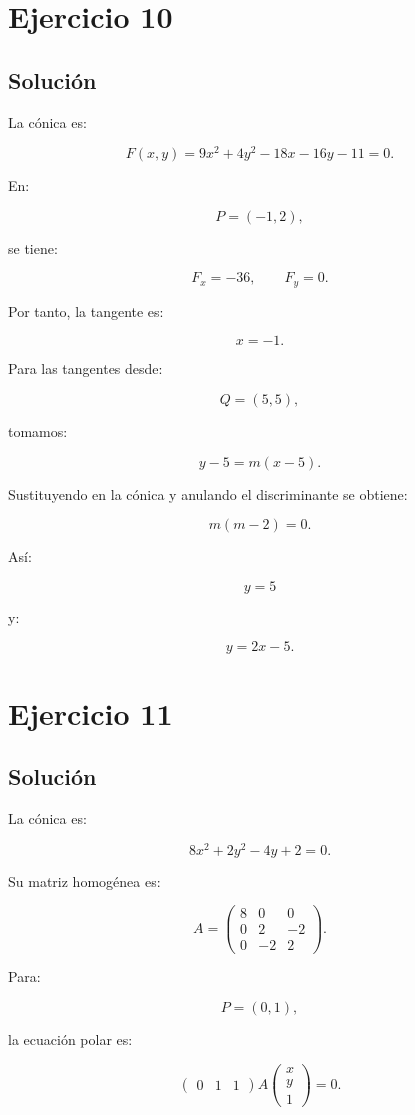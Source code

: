 \documentclass[11pt,a4paper]{article}
\begin{document}
\section{Ejercicio 10}
\subsection{Solución}

La cónica es:

\[
F(x,y)
=
9x^2+4y^2-18x-16y-11=0.
\]

En:

\[
P=(-1,2),
\]

se tiene:

\[
F_x=-36,
\qquad
F_y=0.
\]

Por tanto, la tangente es:

\[
\boxed{x=-1.}
\]

Para las tangentes desde:

\[
Q=(5,5),
\]

tomamos:

\[
y-5=m(x-5).
\]

Sustituyendo en la cónica y anulando el discriminante se obtiene:

\[
m(m-2)=0.
\]

Así:

\[
\boxed{
y=5
}
\]

y:

\[
\boxed{
y=2x-5.
}
\]

\section{Ejercicio 11}
\subsection{Solución}

La cónica es:

\[
8x^2+2y^2-4y+2=0.
\]

Su matriz homogénea es:

\[
A=
\begin{pmatrix}
8&0&0\\
0&2&-2\\
0&-2&2
\end{pmatrix}.
\]

Para:

\[
P=(0,1),
\]

la ecuación polar es:

\[
\begin{pmatrix}
0&1&1
\end{pmatrix}
A
\begin{pmatrix}
x\\y\\1
\end{pmatrix}
=0.
\]
\end{document}
